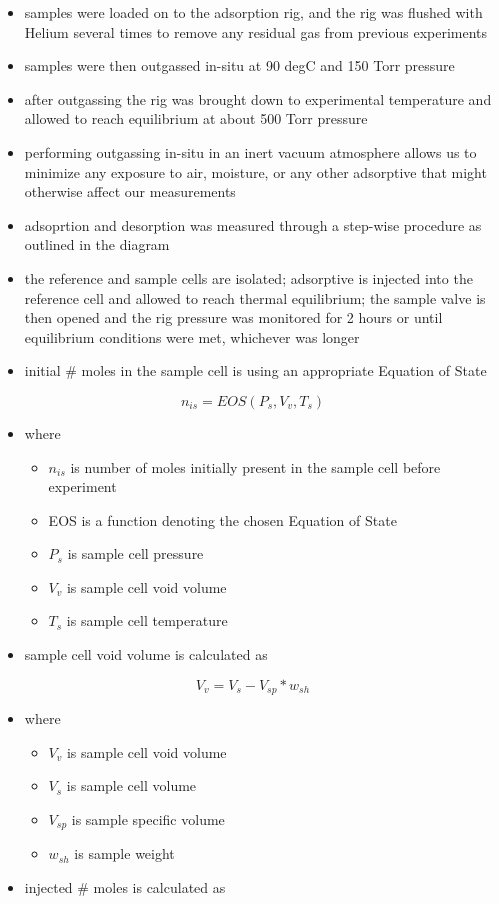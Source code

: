 \documentclass[11pt]{article}
\begin{document}
\begin{itemize}
\item samples were loaded on to the adsorption rig, and the rig was flushed with Helium several times to remove any residual gas from previous experiments
\item samples were then outgassed in-situ at 90 degC and 150 Torr pressure
\item after outgassing the rig was brought down to experimental temperature and allowed to reach equilibrium at about 500 Torr pressure
\item performing outgassing in-situ in an inert vacuum atmosphere allows us to minimize any exposure to air, moisture, or any other adsorptive that might otherwise affect our measurements
\item adsoprtion and desorption was measured through a step-wise procedure as outlined in the diagram
\item the reference and sample cells are isolated; adsorptive is injected into the reference cell and allowed to reach thermal equilibrium; the sample valve is then opened and the rig pressure was monitored for 2 hours or until equilibrium conditions were met, whichever was longer
\item initial \# moles in the sample cell is using an appropriate Equation of State
\end{itemize}
\begin{equation}
n_{is} = EOS(P_{s},V_{v},T_{s})
\end{equation}
\begin{itemize}
\item where
\begin{itemize}
\item \(n_{is}\) is number of moles initially present in the sample cell before experiment
\item EOS is a function denoting the chosen Equation of State
\item \(P_s\) is sample cell pressure
\item \(V_v\) is sample cell void volume
\item \(T_s\) is sample cell temperature
\end{itemize}
\item sample cell void volume is calculated as
\end{itemize}
\begin{equation}
V_v = V_s - V_{sp} * w_{sh}
\end{equation}
\begin{itemize}
\item where
\begin{itemize}
\item \(V_v\) is sample cell void volume
\item \(V_s\) is sample cell volume
\item \(V_{sp}\) is sample specific volume
\item \(w_{sh}\) is sample weight
\end{itemize}
\item injected \# moles is calculated as
\end{itemize}
\end{document}
